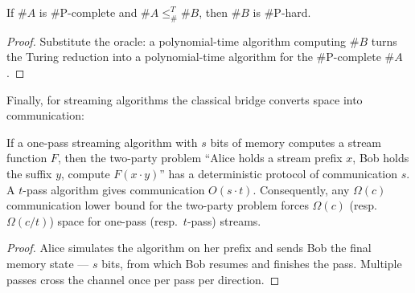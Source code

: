 \begin{proposition}\label{prop:red-sharp}
If $\#A$ is \#P-complete and $\#A \le_\#^T \#B$, then $\#B$ is \#P-hard. \eop
\end{proposition}

\begin{proof}
Substitute the oracle: a polynomial-time algorithm computing $\#B$ turns the Turing
reduction into a polynomial-time algorithm for the \#P-complete $\#A$.
\end{proof}

Finally, for streaming algorithms the classical bridge converts space into
communication:

\begin{proposition}\label{prop:red-comm}
If a one-pass streaming algorithm with $s$ bits of memory computes a stream function
$F$, then the two-party problem ``Alice holds a stream prefix $x$, Bob holds the
suffix $y$, compute $F(x \cdot y)$'' has a deterministic protocol of communication
$s$. A $t$-pass algorithm gives communication $O(s \cdot t)$. Consequently, any
$\Omega(c)$ communication lower bound for the two-party problem forces
$\Omega(c)$ (resp.\ $\Omega(c/t)$) space for one-pass (resp.\ $t$-pass) streams. \eop
\end{proposition}

\begin{proof}
Alice simulates the algorithm on her prefix and sends Bob the final memory state ---
$s$ bits, from which Bob resumes and finishes the pass. Multiple passes cross the
channel once per pass per direction.
\end{proof}

\begin{widefigure}[t]
\caption{Every reduction has two halves: instances travel forward through the gadget;
the currency --- membership, cost ratio, count, time, space, or accuracy --- travels
backward, so quality achieved for $P$ becomes quality for $H$, which the source's
hardness forbids.}
\label{fig:red-skeleton}
\end{widefigure}

